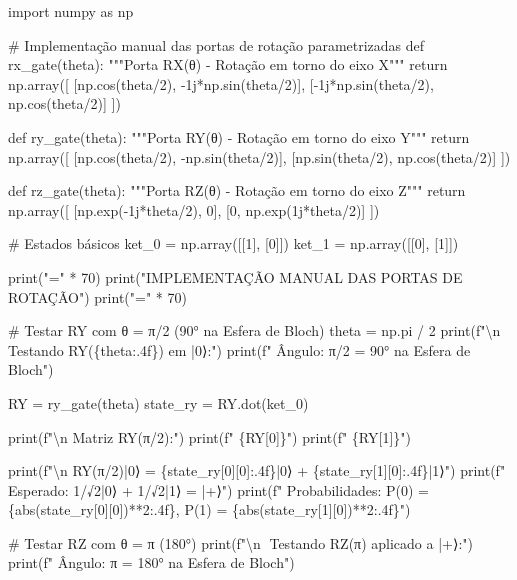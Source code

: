 \documentclass[
  brazilian,
]{report}
\newenvironment{Shaded}{\begin{snugshade}}{\end{snugshade}}
\newcommand{\NormalTok}[1]{\textcolor[rgb]{0.00,0.23,0.31}{#1}}
\begin{document}
\begin{Shaded}
\begin{Highlighting}[]

\NormalTok{import numpy as np}

\NormalTok{\# Implementação manual das portas de rotação parametrizadas}
\NormalTok{def rx\_gate(theta):}
\NormalTok{    """Porta RX(θ) {-} Rotação em torno do eixo X"""}
\NormalTok{    return np.array([}
\NormalTok{        [np.cos(theta/2), {-}1j*np.sin(theta/2)],}
\NormalTok{        [{-}1j*np.sin(theta/2), np.cos(theta/2)]}
\NormalTok{    ])}

\NormalTok{def ry\_gate(theta):}
\NormalTok{    """Porta RY(θ) {-} Rotação em torno do eixo Y"""}
\NormalTok{    return np.array([}
\NormalTok{        [np.cos(theta/2), {-}np.sin(theta/2)],}
\NormalTok{        [np.sin(theta/2), np.cos(theta/2)]}
\NormalTok{    ])}

\NormalTok{def rz\_gate(theta):}
\NormalTok{    """Porta RZ(θ) {-} Rotação em torno do eixo Z"""}
\NormalTok{    return np.array([}
\NormalTok{        [np.exp({-}1j*theta/2), 0],}
\NormalTok{        [0, np.exp(1j*theta/2)]}
\NormalTok{    ])}

\NormalTok{\# Estados básicos}
\NormalTok{ket\_0 = np.array([[1], [0]])}
\NormalTok{ket\_1 = np.array([[0], [1]])}

\NormalTok{print("=" * 70)}
\NormalTok{print("IMPLEMENTAÇÃO MANUAL DAS PORTAS DE ROTAÇÃO")}
\NormalTok{print("=" * 70)}

\NormalTok{\# Testar RY com θ = π/2 (90° na Esfera de Bloch)}
\NormalTok{theta = np.pi / 2}
\NormalTok{print(f"\textbackslash{}n🔹 Testando RY(\{theta:.4f\}) em |0⟩:")}
\NormalTok{print(f"   Ângulo: π/2 = 90° na Esfera de Bloch")}

\NormalTok{RY = ry\_gate(theta)}
\NormalTok{state\_ry = RY.dot(ket\_0)}

\NormalTok{print(f"\textbackslash{}n   Matriz RY(π/2):")}
\NormalTok{print(f"   \{RY[0]\}")}
\NormalTok{print(f"   \{RY[1]\}")}

\NormalTok{print(f"\textbackslash{}n   RY(π/2)|0⟩ = \{state\_ry[0][0]:.4f\}|0⟩ + \{state\_ry[1][0]:.4f\}|1⟩")}
\NormalTok{print(f"   Esperado: 1/√2|0⟩ + 1/√2|1⟩ = |+⟩")}
\NormalTok{print(f"   Probabilidades: P(0) = \{abs(state\_ry[0][0])**2:.4f\}, P(1) = \{abs(state\_ry[1][0])**2:.4f\}")}

\NormalTok{\# Testar RZ com θ = π (180°)}
\NormalTok{print(f"\textbackslash{}n🔹 Testando RZ(π) aplicado a |+⟩:")}
\NormalTok{print(f"   Ângulo: π = 180° na Esfera de Bloch")}


\end{Highlighting}
\end{Shaded}
\end{document}
